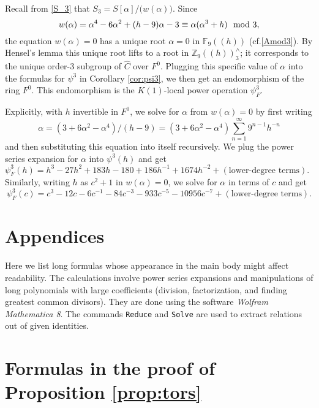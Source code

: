 \documentclass{gtpart}
\theoremstyle{definition}
\theoremstyle{remark}
\newcommand{\mb}[1]{\mathbb{#1}}
\newcommand{\cf}{cf.\thinspace}
\newcommand{\BF}{{\mb F}}
\newcommand{\BZ}{{\mb Z}}
\newcommand{\HC}{\widehat{C}}
\newcommand{\md}{~~{\rm mod}~}
\newcommand{\A}{\alpha}
\newcommand{\p}{\psi^3}
\begin{document}
Recall from \eqref{S_3} that $S_3 = S[\A] \big/ \big( w(\A) \big)$.  Since 
\[
 w(\A) = \A^4 - 6 \A^2 + (h - 9) \A - 3 \equiv \A (\A^3 + h) \md 3, 
\]
the equation $w(\A) = 0$ has a unique root $\A = 0$ in $\BF_9 (\!(h)\!)$ (\cf \eqref{Amod3}).  
By Hensel's lemma this unique root lifts to a root in $\BZ_9 (\!(h)\!)_3^\wedge$; 
it corresponds to the unique order-3 subgroup of $\HC$ over $F^0$.  
Plugging this specific value of $\A$ into the formulas for $\p$ in Corollary \ref{cor:psi3}, we then get an endomorphism of the ring $F^0$.  
This endomorphism is the $K(1)$-local power operation $\psi_F^3$.  

Explicitly, with $h$ invertible in $F^0$, we solve for $\A$ from $w(\A) = 0$ by first writing 
\[
 \A = (3 + 6 \A^2 - \A^4) / (h - 9) = (3 + 6 \A^2 - \A^4) \sum_{n = 1}^\infty 9^{n-1} h^{-n} 
\]
and then substituting this equation into itself recursively.  We plug the power series expansion for $\A$ into $\p(h)$ and get 
\[
 \psi_F^3(h) = h^3 - 27 h^2 + 183 h - 180 + 186 h^{-1} + 1674 h^{-2} + (\text{lower-degree terms}).  ~~~
\]
Similarly, writing $h$ as $c^2 + 1$ in $w(\A) = 0$, we solve for $\A$ in terms of $c$ and get 
\[
 \psi_F^3(c) = c^3 - 12 c - 6 c^{-1} - 84 c^{-3} - 933 c^{-5} - 10956 c^{-7} + (\text{lower-degree terms}).  
\]


\appendix
\section*{Appendices}

Here we list long formulas whose appearance in the main body might affect readability.  
The calculations involve power series expansions and manipulations of long polynomials with large coefficients 
(division, factorization, and finding greatest common divisors).  
They are done using the software {\em Wolfram Mathematica 8}.  
The commands \texttt{Reduce} and \texttt{Solve} are used to extract relations out of given identities.  


\section{Formulas in the proof of Proposition \ref{prop:tors}}
\label{apx:tors}
\end{document}
